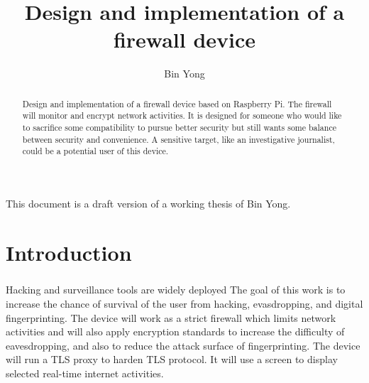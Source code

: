 \documentclass[mscthesis]{usiinfthesis}
\title{Design and implementation of a firewall device} %
\author{Bin Yong} %
\begin{document}
\maketitle %

\frontmatter %

\begin{abstract}
  \paragraph{}
  Design and implementation of a firewall device based on Raspberry Pi. The firewall will monitor and encrypt network activities. It is designed for someone who would like to sacrifice some compatibility to pursue better security but still wants some balance between security and convenience. A sensitive target, like an investigative journalist, could be a potential user of this device.

\end{abstract}

\begin{acknowledgements}
  \paragraph{}
  This document is a draft version of a working thesis of Bin Yong.
\end{acknowledgements}

\tableofcontents
\listoffigures %
\listoftables %

\mainmatter

\chapter{Introduction}
\paragraph{}
Hacking and surveillance tools are widely deployed The goal of this work is to increase the chance of survival of the user from hacking, evasdropping, and digital fingerprinting. The device will work as a strict firewall which limits network activities and will also apply encryption standards to increase the difficulty of eavesdropping, and also to reduce the attack surface of fingerprinting. The device will run a TLS proxy to harden TLS protocol. It will use a screen to display selected real-time internet activities.
\end{document}
